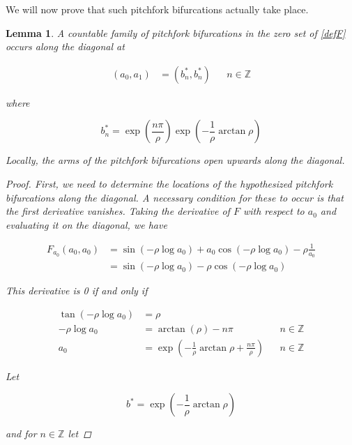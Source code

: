 \documentclass[12pt]{article}
\def\Z{{\mathbb Z}}
\newtheorem{lemma}{Lemma}
\begin{document}
We will now prove that such pitchfork bifurcations actually take place.


\begin{lemma}\label{pitchfork}
A countable family of pitchfork bifurcations in the zero set of \eqref{defF} occurs along the diagonal at 

\begin{align*}
(a_0, a_1) &= (b_n^*, b_n^*) && n \in \Z
\end{align*}

where 

\begin{equation}
b^*_n = \exp\left(\frac{n \pi}{\rho} \right) \exp \left( -\frac{1}{\rho} \arctan \rho \right)
\end{equation}

Locally, the arms of the pitchfork bifurcations open upwards along the diagonal.

\begin{proof}
First, we need to determine the locations of the hypothesized pitchfork bifurcations along the diagonal. A necessary condition for these to occur is that the first derivative vanishes. Taking the derivative of $F$ with respect to $a_0$ and evaluating it on the diagonal, we have

\begin{align*}
F_{a_0}(a_0, a_0) &= 
\sin \left( - \rho \log a_0 \right)
+ a_0 \cos \left( - \rho \log a_0 \right)- \rho \frac{1}{a_0} \\
&= \sin \left( - \rho \log a_0 \right) - \rho \cos \left( - \rho \log a_0 \right)
\end{align*}

This derivative is 0 if and only if

\begin{align*}
\tan \left( -\rho \log a_0 \right) &=  \rho \\
-\rho \log a_0 &= \arctan \left( \rho\right) - n \pi && n \in \Z \\ 
a_0 &= \exp \left( -\frac{1}{\rho} \arctan \rho + \frac{n \pi}{\rho} \right) && n \in \Z
\end{align*}

Let 

\begin{equation}
b^* = \exp \left( -\frac{1}{\rho} \arctan \rho \right)
\end{equation}

and for $n \in \Z$ let 


\end{proof}
\end{lemma}
\end{document}
